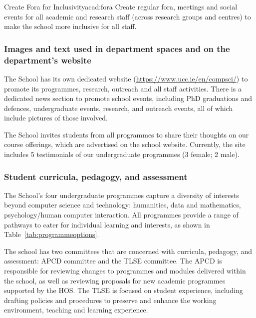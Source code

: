 \newcommand{\actacadfora}{%
Create regular fora, meetings and social events for all academic and research staff (across research groups and centres) to make the school more inclusive for all staff.}
\begin{actionblock}{\ksspace{}Create Fora for Inclusivity}{acad:fora}
\actacadfora
\hfill{
    \hypersetup{hidelinks}
    \hyperlink{c9}{\gotoactionsymbol{}}
}
\end{actionblock}



\subsubsection{Images and text used in department spaces and on the department's website}
The School has its own dedicated website (\url{https://www.ucc.ie/en/compsci/}) to promote its programmes, research, outreach and all staff activities. There is a dedicated news section to promote school events, including PhD graduations and defences, undergraduate events, research, and outreach events, all of which include pictures of those involved.

The School invites students from all programmes to share their thoughts on our course offerings, which are advertised on the school website. Currently, the site includes 5 testimonials of our undergraduate programmes (3 female; 2 male).

\subsubsection{Student curricula, pedagogy, and assessment}
The School's four undergraduate programmes capture a diversity of interests  beyond computer science and technology: humanities, data and mathematics, psychology/human computer interaction. All programmes provide a range of pathways to cater for individual learning and interests, as shown in Table~\ref{tab:programmeoptions}.



The school has two committees that are concerned with curricula, pedagogy, and assessment: \ac{APCD} committee and the \ac{TLSE} committee.
The APCD is responsible for reviewing changes to programmes and modules delivered within the school, as well as reviewing proposals for new academic programmes supported by the \ac{HOS}. The \ac{TLSE} is focused on student experience, including drafting policies and procedures to preserve and enhance the working environment, teaching and learning experience. 

